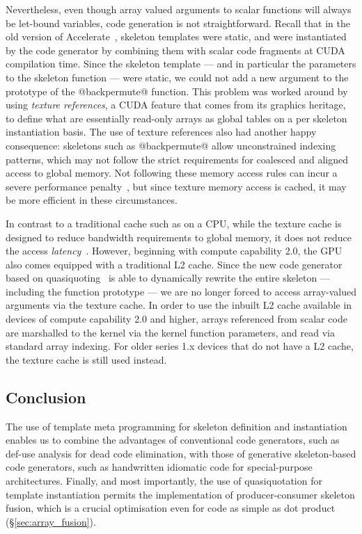 Nevertheless, even though array valued arguments to scalar functions will always
be let-bound variables, code generation is not straightforward. Recall that in
the old version of Accelerate~\cite{Chakravarty:2011fr}, skeleton templates were
static, and were instantiated by the code generator by combining them with
scalar code fragments at CUDA compilation time. Since the skeleton template ---
and in particular the parameters to the skeleton function --- were static, we
could not add a new argument to the prototype of the @backpermute@ function.
This problem was worked around by using \emph{texture references}, a CUDA feature that comes from its graphics heritage, to define
what are essentially read-only arrays as global tables on a per skeleton
instantiation basis. The use of texture references also had another happy
consequence: skeletons such as @backpermute@ allow unconstrained indexing
patterns, which may not follow the strict requirements for coalesced and aligned
access to global memory. Not following these memory access rules can incur a
severe performance penalty~\cite{NVIDIA:2012wf}, but since texture memory access
is cached, it may be more efficient in these circumstances.

In contrast to a traditional cache such as on a CPU, while the texture cache is
designed to reduce bandwidth requirements to global memory, it does not reduce
the access \emph{latency}~\cite[\S5.3.2]{NVIDIA:2012wf}. However, beginning with
compute capability 2.0, the GPU also comes equipped with a traditional L2 cache.
Since the new code generator based on
quasiquoting~\cite{CliftonEverest:2014vi}\qq{} is able to dynamically rewrite
the entire skeleton --- including the function prototype --- we are no longer
forced to access array-valued arguments via the texture cache. In order to use
the inbuilt L2 cache available in devices of compute capability 2.0 and higher,
arrays referenced from scalar code are marshalled to the kernel via the kernel
function parameters, and read via standard array indexing. For older series 1.x
devices that do not have a L2 cache, the texture cache is still used instead.



\subsection{Conclusion}

The use of template meta programming for skeleton definition and instantiation
enables us to combine the advantages of conventional code generators, such as
def-use analysis for dead code elimination, with those of generative
skeleton-based code generators, such as handwritten idiomatic code for
special-purpose architectures. Finally, and most importantly, the use of
quasiquotation for template instantiation permits the implementation of
producer-consumer skeleton fusion, which is a crucial optimisation even for code
as simple as dot product (\S\ref{sec:array_fusion}).


